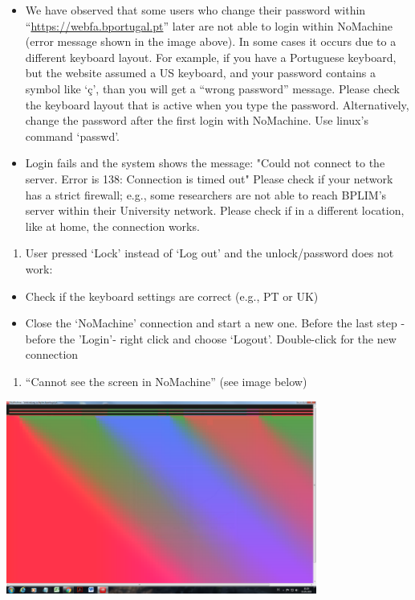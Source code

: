 \documentclass[]{book}
\providecommand{\tightlist}{%
  \setlength{\itemsep}{0pt}\setlength{\parskip}{0pt}}
\begin{document}
\begin{itemize}
\item
  We have observed that some users who change their password within
  ``\url{https://webfa.bportugal.pt}'' later are not able to login within
  NoMachine (error message shown in the image above). In some cases it
  occurs due to a different keyboard layout. For example, if you have
  a Portuguese keyboard, but the website assumed a US keyboard, and
  your password contains a symbol like `ç', than you will get a ``wrong
  password'' message. Please check the keyboard layout that is active
  when you type the password. Alternatively, change the password after
  the first login with NoMachine. Use linux's command `passwd'.
\item
  Login fails and the system shows the message: "Could not connect to
  the server. Error is 138: Connection is timed out" Please check if
  your network has a strict firewall; e.g., some researchers are not
  able to reach BPLIM's server within their University network. Please
  check if in a different location, like at home, the connection
  works.
\end{itemize}

\begin{enumerate}
\def\labelenumi{\arabic{enumi}.}
\setcounter{enumi}{3}
\tightlist
\item
  User pressed `Lock' instead of `Log out' and the unlock/password
  does not work:
\end{enumerate}

\begin{itemize}
\item
  Check if the keyboard settings are correct (e.g., PT or UK)
\item
  Close the `NoMachine' connection and start a new one. Before the
  last step -before the 'Login'- right click and choose `Logout'.
  Double-click for the new connection
\end{itemize}

\begin{enumerate}
\def\labelenumi{\arabic{enumi}.}
\setcounter{enumi}{4}
\tightlist
\item
  ``Cannot see the screen in NoMachine'' (see image below)
\end{enumerate}

\includegraphics[width=4.01667in,height=2.49995in]{./media/image47.png}
\end{document}
